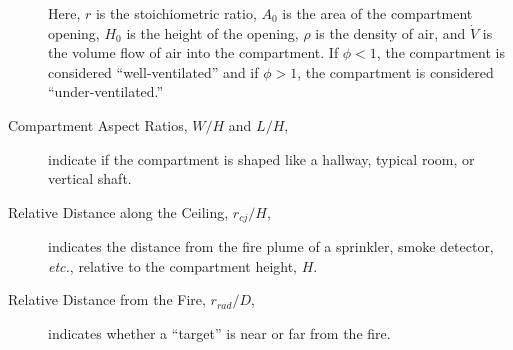 \begin{description}
Here, $r$ is the stoichiometric ratio, $A_0$ is the area of the compartment opening, $H_0$ is the height of the opening, $\rho$ is the density of air, and $\dot{V}$ is the
volume flow of air into the compartment. If $\phi<1$, the compartment is considered ``well-ventilated'' and if $\phi>1$, the compartment is considered ``under-ventilated.''
\item[Compartment Aspect Ratios, $W/H$ and $L/H$,] indicate if the compartment is shaped like a hallway, typical room, or vertical shaft.
\item[Relative Distance along the Ceiling, $r_{cj}/H$,] indicates the distance from the fire plume of a sprinkler, smoke detector, {\em etc.}, relative to the
compartment height, $H$.
\item[Relative Distance from the Fire, $r_{rad}/D$,] indicates whether a ``target'' is near or far from the fire.
\end{description}

